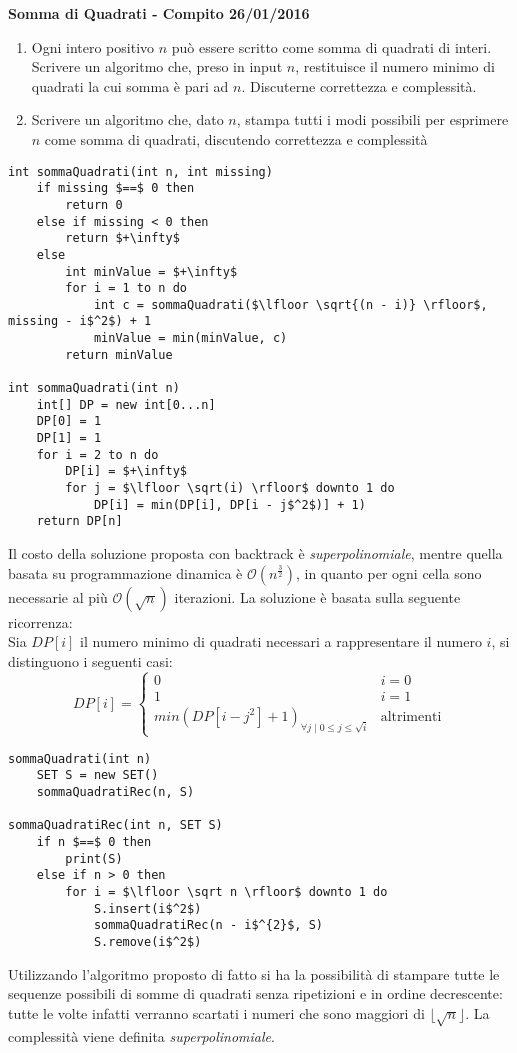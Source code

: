 \documentclass[../cheatSheetAlgoritmi.tex]{subfiles}
\begin{document}
\begin{flushleft}
\textbf{Somma di Quadrati - Compito 26/01/2016}
\end{flushleft}
\begin{enumerate}
	\item Ogni intero positivo $n$ può essere scritto come somma di quadrati di interi. Scrivere un algoritmo che, preso in input $n$, restituisce il numero minimo di quadrati la cui somma è pari ad $n$. Discuterne correttezza e complessità.
	\item Scrivere un algoritmo che, dato $n$, stampa tutti i modi possibili per esprimere $n$ come somma di quadrati, discutendo correttezza e complessità
\end{enumerate}
\begin{lstlisting}[caption=Somma di Quadrati - Conteggio]
int sommaQuadrati(int n, int missing)
    if missing $==$ 0 then
        return 0
    else if missing < 0 then
        return $+\infty$
    else
        int minValue = $+\infty$
        for i = 1 to n do 
            int c = sommaQuadrati($\lfloor \sqrt{(n - i)} \rfloor$, missing - i$^2$) + 1
            minValue = min(minValue, c)
        return minValue

int sommaQuadrati(int n)
    int[] DP = new int[0...n]
    DP[0] = 1
    DP[1] = 1
    for i = 2 to n do
        DP[i] = $+\infty$
        for j = $\lfloor \sqrt(i) \rfloor$ downto 1 do
            DP[i] = min(DP[i], DP[i - j$^2$)] + 1)
    return DP[n]
\end{lstlisting}
Il costo della soluzione proposta con backtrack è \emph{superpolinomiale}, mentre quella basata su programmazione dinamica è $\mathcal{O}(n^\frac{3}{2})$, in quanto per ogni cella sono necessarie al più $\mathcal{O}(\sqrt n)$ iterazioni. La soluzione è basata sulla seguente ricorrenza: \\
Sia $DP[i]$ il numero minimo di quadrati necessari a rappresentare il numero $i$, si distinguono i seguenti casi:
\begin{equation*}
    DP[i]=\begin{cases}
        0 & \text{$i = 0$}\\
        1 & \text{$i = 1$}\\
        min(DP[i - j^2] + 1)_{\forall j \mid 0 \leq j \leq \sqrt i} & \text{altrimenti} 
    \end{cases}
\end{equation*}
\begin{lstlisting}[caption= Somma di Quadrati - Elenco Insiemi]
sommaQuadrati(int n)
	SET S = new SET()
	sommaQuadratiRec(n, S)
	
sommaQuadratiRec(int n, SET S)
	if n $==$ 0 then
		print(S)
	else if n > 0 then
		for i = $\lfloor \sqrt n \rfloor$ downto 1 do
			S.insert(i$^2$)
			sommaQuadratiRec(n - i$^{2}$, S)
			S.remove(i$^2$)	
\end{lstlisting}
Utilizzando l'algoritmo proposto di fatto si ha la possibilità di stampare tutte le sequenze possibili di somme di quadrati senza ripetizioni e in ordine decrescente: tutte le volte infatti verranno scartati i numeri che sono maggiori di $\lfloor \sqrt n \rfloor$. La complessità viene definita \emph{superpolinomiale}.
\end{document}
